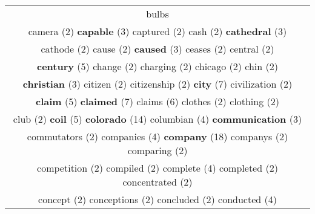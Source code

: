 \documentclass[12pt,a4paper]{article}
\begin{document}
\begin{center}
\begin{longtable}{|c|}
bulbs}} \footnotesize{(3)}  \\ {\footnotesize \textcolor{Verde} {camera}} \footnotesize{(2)} {\small \textcolor{Laranja} {\bf capable}} \footnotesize{(3)} {\footnotesize \textcolor{Verde} {captured}} \footnotesize{(2)} {\footnotesize \textcolor{Verde} {cash}} \footnotesize{(2)} {\small \textcolor{Laranja} {\bf cathedral}} \footnotesize{(3)}  \\ {\footnotesize \textcolor{Verde} {cathode}} \footnotesize{(2)} {\footnotesize \textcolor{Verde} {cause}} \footnotesize{(2)} {\small \textcolor{Laranja} {\bf caused}} \footnotesize{(3)} {\footnotesize \textcolor{Verde} {ceases}} \footnotesize{(2)} {\footnotesize \textcolor{Verde} {central}} \footnotesize{(2)}  \\ {\large \textcolor{Roxo} {\bf century}} \footnotesize{(5)} {\footnotesize \textcolor{Verde} {change}} \footnotesize{(2)} {\footnotesize \textcolor{Verde} {charging}} \footnotesize{(2)} {\footnotesize \textcolor{Verde} {chicago}} \footnotesize{(2)} {\footnotesize \textcolor{Verde} {chin}} \footnotesize{(2)}  \\ {\small \textcolor{Laranja} {\bf christian}} \footnotesize{(3)} {\footnotesize \textcolor{Verde} {citizen}} \footnotesize{(2)} {\footnotesize \textcolor{Verde} {citizenship}} \footnotesize{(2)} {\LARGE \textcolor{Rosa} {\bf city}} \footnotesize{(7)} {\footnotesize \textcolor{Verde} {civilization}} \footnotesize{(2)}  \\ {\large \textcolor{Roxo} {\bf claim}} \footnotesize{(5)} {\LARGE \textcolor{Rosa} {\bf claimed}} \footnotesize{(7)} {\Large \textcolor{VermEscuro} {claims}} \footnotesize{(6)} {\footnotesize \textcolor{Verde} {clothes}} \footnotesize{(2)} {\footnotesize \textcolor{Verde} {clothing}} \footnotesize{(2)}  \\ {\footnotesize \textcolor{Verde} {club}} \footnotesize{(2)} {\large \textcolor{Roxo} {\bf coil}} \footnotesize{(5)} {\Huge \textcolor{AzulEscuro} {\bf colorado}} \footnotesize{(14)} {\normalsize \textcolor{VerdeLocao} {columbian}} \footnotesize{(4)} {\small \textcolor{Laranja} {\bf communication}} \footnotesize{(3)}  \\ {\footnotesize \textcolor{Verde} {commutators}} \footnotesize{(2)} {\normalsize \textcolor{VerdeLocao} {companies}} \footnotesize{(4)} {\Huge \textcolor{AzulEscuro} {\bf company}} \footnotesize{(18)} {\footnotesize \textcolor{Verde} {companys}} \footnotesize{(2)} {\footnotesize \textcolor{Verde} {comparing}} \footnotesize{(2)}  \\ {\footnotesize \textcolor{Verde} {competition}} \footnotesize{(2)} {\footnotesize \textcolor{Verde} {compiled}} \footnotesize{(2)} {\normalsize \textcolor{VerdeLocao} {complete}} \footnotesize{(4)} {\footnotesize \textcolor{Verde} {completed}} \footnotesize{(2)} {\footnotesize \textcolor{Verde} {concentrated}} \footnotesize{(2)}  \\ {\footnotesize \textcolor{Verde} {concept}} \footnotesize{(2)} {\footnotesize \textcolor{Verde} {conceptions}} \footnotesize{(2)} {\footnotesize \textcolor{Verde} {concluded}} \footnotesize{(2)} {\normalsize \textcolor{VerdeLocao} {conducted}} \footnotesize{(4)} 
\end{longtable}
\end{center}
\end{document}
